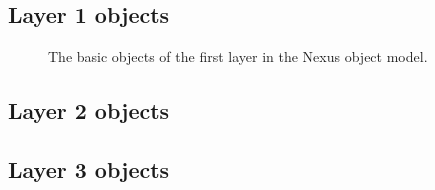\subsection{Layer 1 objects}

\begin{figure}[tb]
    \centering
    \begin{minipage}[c]{0.4\linewidth}
    \centering
    \end{minipage}
    \hspace{0.05\linewidth}
    \begin{minipage}[c]{0.5\linewidth}
    \caption{{\small The basic objects of the first layer in the Nexus object
    model.}}
    \label{fig:nxintro:layer1}
    \end{minipage}
\end{figure}

\subsection{Layer 2 objects}

\subsection{Layer 3 objects}
